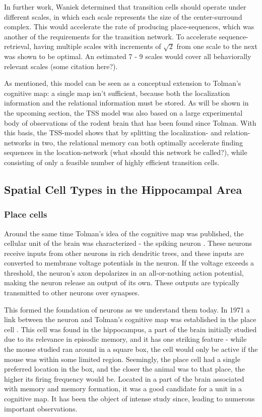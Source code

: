 \documentclass{article}
\begin{document}
    In further work, Waniek determined that transition cells should operate under different scales, in which each scale represents the size of the center-surround complex. This would accelerate the rate of producing place-sequences, which was another of the requirements for the transition network. To accelerate sequence-retrieval, having multiple scales with increments of \(\sqrt{2}\) from one scale to the next was shown to be optimal. An estimated 7 - 9 scales would cover all behaviorally relevant scales (some citation here?).

    As mentioned, this model can be seen as a conceptual extension to Tolman's cognitive map: a single map isn't sufficient, because both the localization information and the relational information must be stored. As will be shown in the upcoming section, the TSS model was also based on a large experimental body of observations of the rodent brain that has been found since Tolman. With this basis, the TSS-model shows that by splitting the localization- and relation-networks in two, the relational memory can both optimally accelerate finding sequences in the location-network (what should this network be called?), while consisting of only a feasible number of highly efficient transition cells.

    
    \subsection{Spatial Cell Types in the Hippocampal Area} \label{Spatial Cell}
    
    \subsubsection{Place cells} \label{place cells}
    Around the same time Tolman's idea of the cognitive map was published, the cellular unit of the brain was characterized - the spiking neuron \parencite{Hodgkin1952}. These neurons receive inputs from other neurons in rich dendritic trees, and these inputs are converted to membrane voltage potentials in the neuron. If the voltage exceeds a threshold, the neuron's axon depolarizes in an all-or-nothing action potential, making the neuron release an output of its own. These outputs are typically transmitted to other neurons over synapses.

    This formed the foundation of neurons as we understand them today. In 1971 a link between the neuron and Tolman's cognitive map was established in the place cell \parencite{OKeefe1971,OKeefe1976}. This cell was found in the hippocampus, a part of the brain initially studied due to its relevance in episodic memory, and it has one striking feature - while the mouse studied ran around in a square box, the cell would only be active if the mouse was within some limited region. Seemingly, the place cell had a single preferred location in the box, and the closer the animal was to that place, the higher its firing frequency would be. Located in a part of the brain associated with memory and memory formation, it was a good candidate for a unit in a cognitive map. It has been the object of intense study since, leading to numerous important observations.
\end{document}
